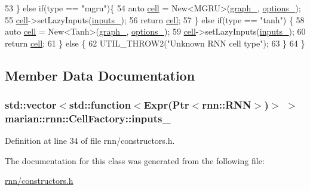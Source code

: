 \begin{DoxyCode}
53     \} \textcolor{keywordflow}{else} \textcolor{keywordflow}{if}(type == \textcolor{stringliteral}{"mgru"})\{
54       \textcolor{keyword}{auto} \hyperlink{namespacemarian_1_1rnn_af723e51535e0b11de5b28fe19627a3fb}{cell} = New<MGRU>(\hyperlink{classmarian_1_1Factory_aa23d3b5d72140912b8666a97f5cf10e5}{graph\_}, \hyperlink{classmarian_1_1Factory_a9bb7f7a432f482665443b33a38cb433a}{options\_});
55       \hyperlink{namespacemarian_1_1rnn_af723e51535e0b11de5b28fe19627a3fb}{cell}->setLazyInputs(\hyperlink{classmarian_1_1rnn_1_1CellFactory_a1a1309730b71955d9e6a14189a295e21}{inputs\_});
56       \textcolor{keywordflow}{return} \hyperlink{namespacemarian_1_1rnn_af723e51535e0b11de5b28fe19627a3fb}{cell};
57     \} \textcolor{keywordflow}{else} \textcolor{keywordflow}{if}(type == \textcolor{stringliteral}{"tanh"}) \{
58       \textcolor{keyword}{auto} \hyperlink{namespacemarian_1_1rnn_af723e51535e0b11de5b28fe19627a3fb}{cell} = New<Tanh>(\hyperlink{classmarian_1_1Factory_aa23d3b5d72140912b8666a97f5cf10e5}{graph\_}, \hyperlink{classmarian_1_1Factory_a9bb7f7a432f482665443b33a38cb433a}{options\_});
59       \hyperlink{namespacemarian_1_1rnn_af723e51535e0b11de5b28fe19627a3fb}{cell}->setLazyInputs(\hyperlink{classmarian_1_1rnn_1_1CellFactory_a1a1309730b71955d9e6a14189a295e21}{inputs\_});
60       \textcolor{keywordflow}{return} \hyperlink{namespacemarian_1_1rnn_af723e51535e0b11de5b28fe19627a3fb}{cell};
61     \} \textcolor{keywordflow}{else} \{
62       UTIL\_THROW2(\textcolor{stringliteral}{"Unknown RNN cell type"});
63     \}
64   \}
\end{DoxyCode}


\subsection{Member Data Documentation}
\subsubsection[{\texorpdfstring{inputs\+\_\+}{inputs_}}]{\setlength{\rightskip}{0pt plus 5cm}std\+::vector$<$std\+::function$<${\bf Expr}({\bf Ptr}$<$rnn\+::\+R\+NN$>$)$>$ $>$ marian\+::rnn\+::\+Cell\+Factory\+::inputs\+\_\+\hspace{0.3cm}{\ttfamily [protected]}}\hypertarget{classmarian_1_1rnn_1_1CellFactory_a1a1309730b71955d9e6a14189a295e21}{}\label{classmarian_1_1rnn_1_1CellFactory_a1a1309730b71955d9e6a14189a295e21}


Definition at line 34 of file rnn/constructors.\+h.



The documentation for this class was generated from the following file\+:\begin{DoxyCompactItemize}
\item 
\hyperlink{rnn_2constructors_8h}{rnn/constructors.\+h}\end{DoxyCompactItemize}
